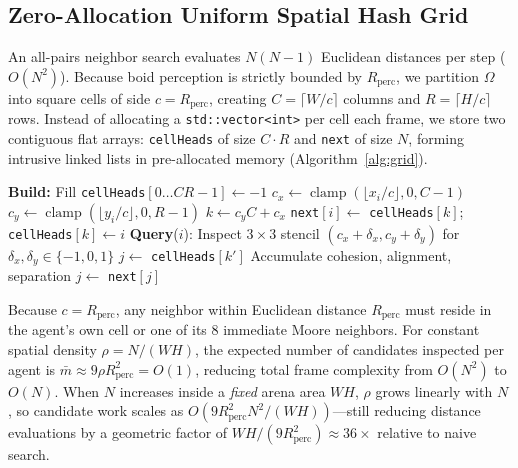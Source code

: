 \documentclass[10pt,twocolumn]{article}
\begin{document}
\subsection{Zero-Allocation Uniform Spatial Hash Grid}
An all-pairs neighbor search evaluates $N(N-1)$ Euclidean distances per step ($O(N^2)$). Because boid perception is strictly bounded by $R_{\text{perc}}$, we partition $\Omega$ into square cells of side $c = R_{\text{perc}}$, creating $C = \lceil W/c \rceil$ columns and $R = \lceil H/c \rceil$ rows. Instead of allocating a \texttt{std::vector<int>} per cell each frame, we store two contiguous flat arrays: \texttt{cellHeads} of size $C \cdot R$ and \texttt{next} of size $N$, forming intrusive linked lists in pre-allocated memory (Algorithm~\ref{alg:grid}).

\begin{algorithm}[t]
\caption{Zero-Allocation Spatial Grid Build \& Query}
\label{alg:grid}
\begin{algorithmic}[1]
\State \textbf{Build:} Fill \texttt{cellHeads}$[0 \dots CR-1] \gets -1$
    \State $c_x \gets \operatorname{clamp}(\lfloor x_i / c \rfloor, 0, C - 1)$
    \State $c_y \gets \operatorname{clamp}(\lfloor y_i / c \rfloor, 0, R - 1)$
    \State $k \gets c_y C + c_x$
    \State \texttt{next}$[i] \gets$ \texttt{cellHeads}$[k]$; \quad \texttt{cellHeads}$[k] \gets i$
\EndFor
\State \textbf{Query}($i$): Inspect $3 \times 3$ stencil $(c_x + \delta_x, c_y + \delta_y)$ for $\delta_x, \delta_y \in \{-1, 0, 1\}$
    \State $j \gets$ \texttt{cellHeads}$[k']$
            \State Accumulate cohesion, alignment, separation
        \EndIf
        \State $j \gets$ \texttt{next}$[j]$
    \EndWhile
\EndFor
\end{algorithmic}
\end{algorithm}

Because $c = R_{\text{perc}}$, any neighbor within Euclidean distance $R_{\text{perc}}$ must reside in the agent's own cell or one of its 8 immediate Moore neighbors. For constant spatial density $\rho = N / (WH)$, the expected number of candidates inspected per agent is $\bar{m} \approx 9\rho R_{\text{perc}}^2 = O(1)$, reducing total frame complexity from $O(N^2)$ to $O(N)$. When $N$ increases inside a \emph{fixed} arena area $WH$, $\rho$ grows linearly with $N$, so candidate work scales as $O(9 R_{\text{perc}}^2 N^2 / (WH))$---still reducing distance evaluations by a geometric factor of $WH / (9 R_{\text{perc}}^2) \approx 36\times$ relative to naive search.
\end{document}
